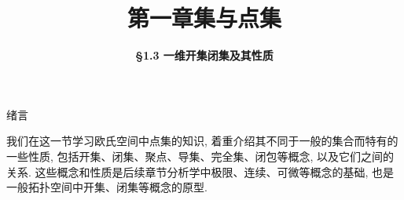 \everymath{\displaystyle}



\title[第一章\\
集与点集]{\texorpdfstring{\LARGE \bfseries 第一章\quad 集与点集}{第一章 集与点集}} %
\author[\S 1.3\\
一维开集闭集] %
{\Large \bfseries \S 1.3 一维开集闭集及其性质}
\date{}





\begin{frame}

\titlepage %

\end{frame}





\begin{frame}{绪言}

{
\larger[1]\renewcommand{\baselinestretch}{1.5}\selectfont
我们在这一节学习欧氏空间中点集的知识, 着重介绍其不同于一般的集合而特有的一些性质, 包括开集、闭集、聚点、导集、完全集、闭包等概念, 以及它们之间的关系. 这些概念和性质是后续章节分析学中极限、连续、可微等概念的基础, 也是一般拓扑空间中开集、闭集等概念的原型.\par
}

\end{frame}

